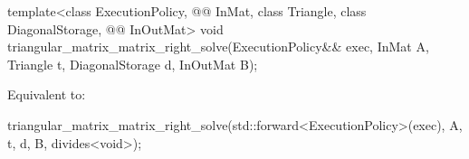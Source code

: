 \begin{itemdecl}
template<class ExecutionPolicy,
         @@ InMat, class Triangle, class DiagonalStorage, @@ InOutMat>
  void triangular_matrix_matrix_right_solve(ExecutionPolicy&& exec,
                                            InMat A, Triangle t, DiagonalStorage d,
                                            InOutMat B);
\end{itemdecl}

\begin{itemdescr}
\pnum
\effects
Equivalent to:
\begin{codeblock}
triangular_matrix_matrix_right_solve(std::forward<ExecutionPolicy>(exec),
                                     A, t, d, B, divides<void>{});
\end{codeblock}
\end{itemdescr}

